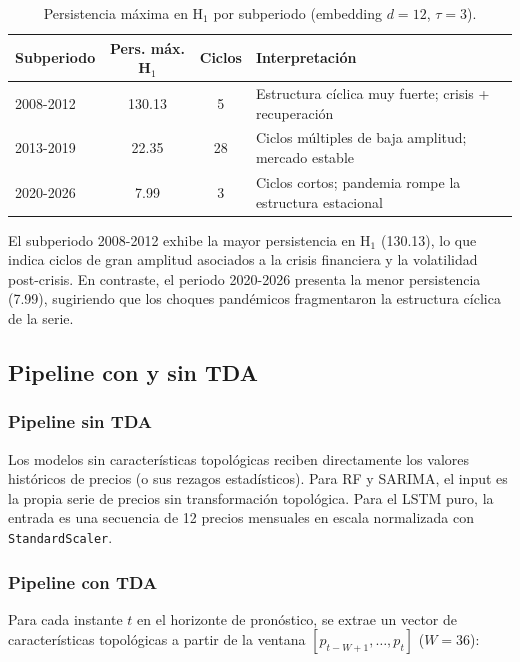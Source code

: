 \documentclass[12pt, a4paper]{article}
\begin{document}
\begin{table}[H]
  \centering
  \caption{Persistencia máxima en H$_1$ por subperiodo (embedding $d=12$, $\tau=3$).}
  \label{tab:persistencia_h1}
  \begin{tabularx}{\linewidth}{lccX}
    \toprule
    \textbf{Subperiodo} & \textbf{Pers. máx. H$_1$} & \textbf{Ciclos} & \textbf{Interpretación} \\
    \midrule
    2008-2012 & 130.13 & 5  & Estructura cíclica muy fuerte; crisis + recuperación \\
    2013-2019 & 22.35  & 28 & Ciclos múltiples de baja amplitud; mercado estable \\
    2020-2026 & 7.99   & 3  & Ciclos cortos; pandemia rompe la estructura estacional \\
    \bottomrule
  \end{tabularx}
\end{table}

El subperiodo 2008-2012 exhibe la mayor persistencia en H$_1$ (130.13), lo que indica ciclos
de gran amplitud asociados a la crisis financiera y la volatilidad post-crisis. En contraste,
el periodo 2020-2026 presenta la menor persistencia (7.99), sugiriendo que los choques pandémicos
fragmentaron la estructura cíclica de la serie.

\subsection{Pipeline con y sin TDA}

\subsubsection{Pipeline sin TDA}

Los modelos sin características topológicas reciben directamente los valores históricos de precios
(o sus rezagos estadísticos). Para RF y SARIMA, el input es la propia serie de precios sin
transformación topológica. Para el LSTM puro, la entrada es una secuencia de 12 precios mensuales
en escala normalizada con \texttt{StandardScaler}.

\subsubsection{Pipeline con TDA}

Para cada instante $t$ en el horizonte de pronóstico, se extrae un vector de características
topológicas a partir de la ventana $[p_{t-W+1}, \ldots, p_t]$ ($W = 36$):
\end{document}
